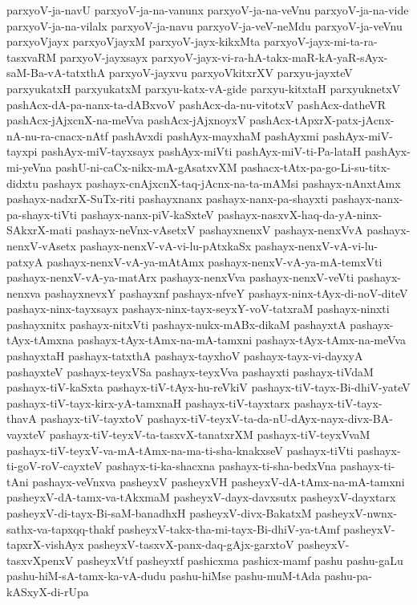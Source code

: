 {parxyoV-ja-navU
parxyoV-ja-na-vanunx
parxyoV-ja-na-veVnu
parxyoV-ja-na-vide
parxyoV-ja-na-vilalx
parxyoV-ja-navu
parxyoV-ja-veV-neMdu
parxyoV-ja-veVnu
parxyoVjayx
parxyoVjayxM
parxyoV-jayx-kikxMta
parxyoV-jayx-mi-ta-ra-tasxvaRM
parxyoV-jayxsayx
parxyoV-jayx-vi-ra-hA-takx-maR-kA-yaR-sAyx-saM-Ba-vA-tatxthA
parxyoV-jayxvu
parxyoVkitxrXV
parxyu-jayxteV
parxyukatxH
parxyukatxM
parxyu-katx-vA-gide
parxyu-kitxtaH
parxyuknetxV
pashAcx-dA-pa-nanx-ta-dABxvoV
pashAcx-da-nu-vitotxV
pashAcx-datheVR
pashAcx-jAjxcnX-na-meVva
pashAcx-jAjxnoyxV
pashAcx-tApxrX-patx-jAcnx-nA-nu-ra-cnacx-nAtf
pashAvxdi
pashAyx-mayxhaM
pashAyxmi
pashAyx-miV-tayxpi
pashAyx-miV-tayxsayx
pashAyx-miVti
pashAyx-miV-ti-Pa-lataH
pashAyx-mi-yeVna
pashU-ni-caCx-nikx-mA-gAsatxvXM
pashacx-tAtx-pa-go-Li-su-titx-didxtu
pashayx
pashayx-cnAjxcnX-taq-jAcnx-na-ta-mAMsi
pashayx-nAnxtAmx
pashayx-nadxrX-SuTx-riti
pashayxnanx
pashayx-nanx-pa-shayxti
pashayx-nanx-pa-shayx-tiVti
pashayx-nanx-piV-kaSxteV
pashayx-nasxvX-haq-da-yA-ninx-SAkxrX-mati
pashayx-neVnx-vAsetxV
pashayxnenxV
pashayx-nenxVvA
pashayx-nenxV-vAsetx
pashayx-nenxV-vA-vi-lu-pAtxkaSx
pashayx-nenxV-vA-vi-lu-patxyA
pashayx-nenxV-vA-ya-mAtAmx
pashayx-nenxV-vA-ya-mA-temxVti
pashayx-nenxV-vA-ya-matArx
pashayx-nenxVva
pashayx-nenxV-veVti
pashayx-nenxva
pashayxnevxY
pashayxnf
pashayx-nfveY
pashayx-ninx-tAyx-di-noV-diteV
pashayx-ninx-tayxsayx
pashayx-ninx-tayx-seyxY-voV-tatxraM
pashayx-ninxti
pashayxnitx
pashayx-nitxVti
pashayx-nukx-mABx-dikaM
pashayxtA
pashayx-tAyx-tAmxna
pashayx-tAyx-tAmx-na-mA-tamxni
pashayx-tAyx-tAmx-na-meVva
pashayxtaH
pashayx-tatxthA
pashayx-tayxhoV
pashayx-tayx-vi-dayxyA
pashayxteV
pashayx-teyxVSa
pashayx-teyxVva
pashayxti
pashayx-tiVdaM
pashayx-tiV-kaSxta
pashayx-tiV-tAyx-hu-reVkiV
pashayx-tiV-tayx-Bi-dhiV-yateV
pashayx-tiV-tayx-kirx-yA-tamxnaH
pashayx-tiV-tayxtarx
pashayx-tiV-tayx-thavA
pashayx-tiV-tayxtoV
pashayx-tiV-teyxV-ta-da-nU-dAyx-nayx-divx-BA-vayxteV
pashayx-tiV-teyxV-ta-tasxvX-tanatxrXM
pashayx-tiV-teyxVvaM
pashayx-tiV-teyxV-va-mA-tAmx-na-ma-ti-sha-knakxseV
pashayx-tiVti
pashayx-ti-goV-roV-cayxteV
pashayx-ti-ka-shacxna
pashayx-ti-sha-bedxVna
pashayx-ti-tAni
pashayx-veVnxva
pasheyxV
pasheyxVH
pasheyxV-dA-tAmx-na-mA-tamxni
pasheyxV-dA-tamx-va-tAkxmaM
pasheyxV-dayx-davxsutx
pasheyxV-dayxtarx
pasheyxV-di-tayx-Bi-saM-banadhxH
pasheyxV-divx-BakatxM
pasheyxV-nwnx-sathx-va-tapxqq-thakf
pasheyxV-takx-tha-mi-tayx-Bi-dhiV-ya-tAmf
pasheyxV-tapxrX-vishAyx
pasheyxV-tasxvX-panx-daq-gAjx-garxtoV
pasheyxV-tasxvXpenxV
pasheyxVtf
pasheyxtf
pashicxma
pashicx-mamf
pashu
pashu-gaLu
pashu-hiM-sA-tamx-ka-vA-dudu
pashu-hiMse
pashu-muM-tAda
pashu-pa-kASxyX-di-rUpa
}
